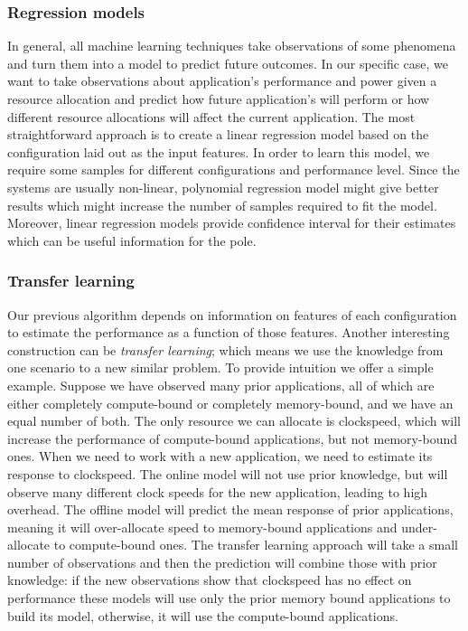 \subsubsection{Regression models}
In general, all machine learning techniques take observations of some
phenomena and turn them into a model to predict future outcomes.  In
our specific case, we want to take observations about application's
performance and power given a resource allocation and predict how
future application's will perform or how different resource
allocations will affect the current application. The most straightforward approach 
is to create a linear regression model based on the configuration laid 
out as the input features. In order to learn this model, we require some samples
for different configurations and performance level. Since the systems are usually non-linear,
polynomial regression model might give better results which might increase the number of samples
required to fit the model. Moreover, linear regression models provide confidence interval for their estimates 
which can be useful information for the pole. 

\subsubsection{Transfer learning}

Our previous algorithm depends on information on features of each 
configuration to estimate the performance as a function of those features. 
Another interesting construction can be \textit{transfer learning}; which means 
we use the knowledge from one scenario to a new similar problem. To provide intuition we offer a simple example.  Suppose we have
observed many prior applications, all of which are either completely
compute-bound or completely memory-bound, and we have an equal number
of both.  The only resource we can allocate is clockspeed, which will
increase the performance of compute-bound applications, but not
memory-bound ones.  When we need to work with a new application, we
need to estimate its response to clockspeed.  The online model will
not use prior knowledge, but will observe many different clock speeds
for the new application, leading to high overhead.  The offline model
will predict the mean response of prior applications, meaning it will
over-allocate speed to memory-bound applications and under-allocate to
compute-bound ones.  The transfer learning approach will take a small number of observations
and then the prediction will combine those with prior knowledge: if
the new observations show that clockspeed has no effect on performance
these models will use only the prior memory bound applications to build its
model, otherwise, it will use the compute-bound applications.  




